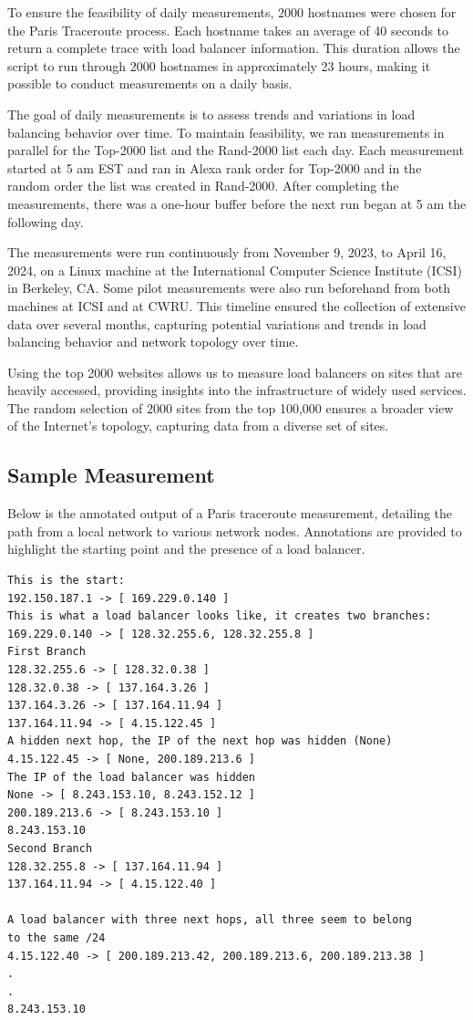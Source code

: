 \documentclass[12pt]{cwru_thesis}
\begin{document}
To ensure the feasibility of daily measurements, 2000 hostnames were chosen for the Paris Traceroute process. Each hostname takes an average of 40 seconds to return a complete trace with load balancer information. This duration allows the script to run through 2000 hostnames in approximately 23 hours, making it possible to conduct measurements on a daily basis.

The goal of daily measurements is to assess trends and variations in load balancing behavior over time. To maintain feasibility, we ran measurements in parallel for the Top-2000 list and the Rand-2000 list each day. Each measurement started at 5 am EST and ran in Alexa rank order for Top-2000 and in the random order the list was created in Rand-2000. After completing the measurements, there was a one-hour buffer before the next run began at 5 am the following day.

The measurements were run continuously from November 9, 2023, to April 16, 2024, on a Linux machine at the International Computer Science Institute (ICSI) in Berkeley, CA. Some pilot measurements were also run beforehand from both machines at ICSI and at CWRU.
This timeline ensured the collection of extensive data over several months, capturing potential variations and trends in load balancing behavior and network topology over time. 

Using the top 2000 websites allows us to measure load balancers on sites that are heavily accessed, providing insights into the infrastructure of widely used services. The random selection of 2000 sites from the top 100,000 ensures a broader view of the Internet's topology, capturing data from a diverse set of sites.

\subsection{Sample Measurement}
Below is the annotated output of a Paris traceroute measurement, detailing the path from a local network to various network nodes. Annotations are provided to highlight the starting point and the presence of a load balancer.
\begin{verbatim}
This is the start:
192.150.187.1 -> [ 169.229.0.140 ]
This is what a load balancer looks like, it creates two branches:
169.229.0.140 -> [ 128.32.255.6, 128.32.255.8 ]
First Branch
128.32.255.6 -> [ 128.32.0.38 ]
128.32.0.38 -> [ 137.164.3.26 ]
137.164.3.26 -> [ 137.164.11.94 ]
137.164.11.94 -> [ 4.15.122.45 ]
A hidden next hop, the IP of the next hop was hidden (None)
4.15.122.45 -> [ None, 200.189.213.6 ]
The IP of the load balancer was hidden
None -> [ 8.243.153.10, 8.243.152.12 ]
200.189.213.6 -> [ 8.243.153.10 ]
8.243.153.10
Second Branch 
128.32.255.8 -> [ 137.164.11.94 ]
137.164.11.94 -> [ 4.15.122.40 ]

A load balancer with three next hops, all three seem to belong
to the same /24
4.15.122.40 -> [ 200.189.213.42, 200.189.213.6, 200.189.213.38 ]
.
.
8.243.153.10
\end{verbatim}
\end{document}
